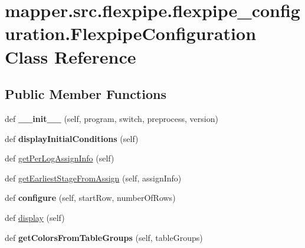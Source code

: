 \hypertarget{classmapper_1_1src_1_1flexpipe_1_1flexpipe__configuration_1_1_flexpipe_configuration}{}\section{mapper.\+src.\+flexpipe.\+flexpipe\+\_\+configuration.\+Flexpipe\+Configuration Class Reference}
\label{classmapper_1_1src_1_1flexpipe_1_1flexpipe__configuration_1_1_flexpipe_configuration}
\subsection*{Public Member Functions}
\begin{DoxyCompactItemize}
\item 
\hypertarget{classmapper_1_1src_1_1flexpipe_1_1flexpipe__configuration_1_1_flexpipe_configuration_ad1477f2b84c0a34090a04f01d159fd8d}{}def {\bfseries \+\_\+\+\_\+init\+\_\+\+\_\+} (self, program, switch, preprocess, version)\label{classmapper_1_1src_1_1flexpipe_1_1flexpipe__configuration_1_1_flexpipe_configuration_ad1477f2b84c0a34090a04f01d159fd8d}

\item 
\hypertarget{classmapper_1_1src_1_1flexpipe_1_1flexpipe__configuration_1_1_flexpipe_configuration_a9abef61c74b66b9bbb4ebb6e52bcfd4f}{}def {\bfseries display\+Initial\+Conditions} (self)\label{classmapper_1_1src_1_1flexpipe_1_1flexpipe__configuration_1_1_flexpipe_configuration_a9abef61c74b66b9bbb4ebb6e52bcfd4f}

\item 
def \hyperlink{classmapper_1_1src_1_1flexpipe_1_1flexpipe__configuration_1_1_flexpipe_configuration_a353b2acd97a6bbeac04f12113cab92a0}{get\+Per\+Log\+Assign\+Info} (self)
\item 
def \hyperlink{classmapper_1_1src_1_1flexpipe_1_1flexpipe__configuration_1_1_flexpipe_configuration_a5b0d9a6c6ec1d34da8c0ced0e7ffdd90}{get\+Earliest\+Stage\+From\+Assign} (self, assign\+Info)
\item 
\hypertarget{classmapper_1_1src_1_1flexpipe_1_1flexpipe__configuration_1_1_flexpipe_configuration_a9d60b71bcd41989ea56581e8b309965f}{}def {\bfseries configure} (self, start\+Row, number\+Of\+Rows)\label{classmapper_1_1src_1_1flexpipe_1_1flexpipe__configuration_1_1_flexpipe_configuration_a9d60b71bcd41989ea56581e8b309965f}

\item 
def \hyperlink{classmapper_1_1src_1_1flexpipe_1_1flexpipe__configuration_1_1_flexpipe_configuration_a7a42a167b54bbcf85f1c26ead6593d11}{display} (self)
\item 
\hypertarget{classmapper_1_1src_1_1flexpipe_1_1flexpipe__configuration_1_1_flexpipe_configuration_a305b089197866964769330cc4d49f733}{}def {\bfseries get\+Colors\+From\+Table\+Groups} (self, table\+Groups)\label{classmapper_1_1src_1_1flexpipe_1_1flexpipe__configuration_1_1_flexpipe_configuration_a305b089197866964769330cc4d49f733}


\end{DoxyCompactItemize}
